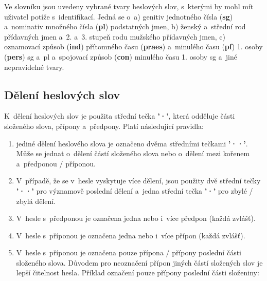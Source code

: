 Ve slovníku jsou uvedeny vybrané tvary heslových slov, s~kterými by mohl mít uživatel potíže s~identifikací. Jedná se o~a) genitiv jednotného čísla ({\textbf{sg}}) a~nominativ množného čísla ({\textbf{pl}}) podstatných jmen, b) ženský a~střední rod přídavných jmen a~2. a~3. stupeň rodu mužského přídavných jmen, c) oznamovací způsob ({\textbf{ind}}) přítomného času ({\textbf{praes}}) a~minulého času ({\textbf{pf}}) 1. osoby ({\textbf{pers}}) sg a~pl a~spojovací způsob ({\textbf{con}}) minulého času 1. osoby sg a~jiné nepravidelné tvary.

\blspace
  \dicEntry {}   
\blspace

\subsection*{Dělení heslových slov}

K~dělení heslových slov je použita střední tečka \textbf{'·'}, která odděluje části složeného slova, přípony a~předpony. Platí následující pravidla:

\renewcommand{\labelenumi}{\alph{enumi})}
\begin{enumerate}
\item jediné dělení heslového slova je označeno dvěma středními tečkami \textbf{'··'}. Může se jednat o~dělení částí složeného slova
\blspace
\dicEntry {}
nebo o~dělení mezi kořenem a~předponou / příponou.
\dicEntry {}
\blspace
\item V~případě, že se v~hesle vyskytuje více dělení, jsou použity dvě střední tečky \textbf{'··'} pro významově poslední dělení a~jedna střední tečka \textbf{'·'} pro zbylé / zbylá dělení.
\blspace
\dicEntry {}
\blspace
\item V~hesle s~předponou je označena jedna nebo i~více předpon (každá zvlášť).
\blspace
\dicEntry {}
\blspace
\item V~hesle s~příponou je označena jedna nebo i~více přípon (každá zvlášť).
\blspace
\dicEntry {}
\blspace
\item V~hesle s~příponou je označena pouze přípona / přípony poslední části složeného slova. Důvodem pro neoznačení přípon jiných částí složených slov je lepší čitelnost hesla. Příklad označení pouze přípony poslední části složeniny:
\blspace
\dicEntry {}
\end{enumerate}

